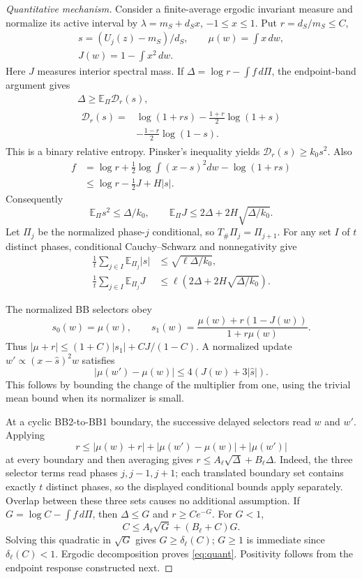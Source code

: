\documentclass[letterpaper,twoside]{article}
\begin{document}
\begin{proof}[Quantitative mechanism]
Consider a finite-average ergodic invariant measure and normalize its active interval by $\lambda=m_S+d_Sx$, $-1\le x\le1$. Put $r=d_S/m_S\le C$,
\[
\begin{gathered}
 s=(U_j(z)-m_S)/d_S,\qquad\mu(w)=\int x\,dw,\\
 J(w)=1-\int x^2\,dw.
\end{gathered}
\]
Here $J$ measures interior spectral mass. If $\Delta=\log r-\int f\,d\Pi$, the endpoint-band argument gives
\[
\begin{gathered}
 \Delta\ge\mathbb E_\Pi\mathcal D_r(s),\\
 \begin{aligned}
 \mathcal D_r(s)={}&\log(1+rs)-\tfrac{1+r}{2}\log(1+s)\\
 &-\tfrac{1-r}{2}\log(1-s).
 \end{aligned}
\end{gathered}
\]
This is a binary relative entropy. Pinsker's inequality yields $\mathcal D_r(s)\ge k_0s^2$. Also
\[
\begin{aligned}
 f&=\log r+\tfrac12\log\!\int(x-s)^2dw-\log(1+rs)\\
 &\le\log r-\tfrac12J+H|s|.
\end{aligned}
\]
Consequently
\begin{equation}\label{eq:defects}
 \mathbb E_\Pi s^2\le\Delta/k_0,\qquad
 \mathbb E_\Pi J\le 2\Delta+2H\sqrt{\Delta/k_0}.
\end{equation}
Let $\Pi_j$ be the normalized phase-$j$ conditional, so $T_\#\Pi_j=\Pi_{j+1}$. For any set $I$ of $t$ distinct phases, conditional Cauchy--Schwarz and nonnegativity give
\[
\begin{aligned}
 \frac1t\sum_{j\in I}\mathbb E_{\Pi_j}|s|&\le\sqrt{\ell\Delta/k_0},\\
 \frac1t\sum_{j\in I}\mathbb E_{\Pi_j}J
 &\le\ell(2\Delta+2H\sqrt{\Delta/k_0}).
\end{aligned}
\]

The normalized BB selectors obey
\[
 s_0(w)=\mu(w),\qquad
 s_1(w)=\frac{\mu(w)+r(1-J(w))}{1+r\mu(w)}.
\]
Thus $|\mu+r|\le(1+C)|s_1|+C J/(1-C)$. A normalized update $w'\propto(x-\widehat s)^2w$ satisfies
\[
 |\mu(w')-\mu(w)|\le4(J(w)+3|\widehat s|).
\]
This follows by bounding the change of the multiplier from one, using the trivial mean bound when its normalizer is small.

At a cyclic BB2-to-BB1 boundary, the successive delayed selectors read $w$ and $w'$. Applying
\[
 r\le|\mu(w)+r|+|\mu(w')-\mu(w)|+|\mu(w')|
\]
at every boundary and then averaging gives $r\le A_\ell\sqrt\Delta+B_\ell\Delta$. Indeed, the three selector terms read phases $j,j-1,j+1$; each translated boundary set contains exactly $t$ distinct phases, so the displayed conditional bounds apply separately. Overlap between these three sets causes no additional assumption. If $G=\log C-\int f\,d\Pi$, then $\Delta\le G$ and $r\ge Ce^{-G}$. For $G<1$,
\[
 C\le A_\ell\sqrt G+(B_\ell+C)G.
\]
Solving this quadratic in $\sqrt G$ gives $G\ge\delta_\ell(C)$; $G\ge1$ is immediate since $\delta_\ell(C)<1$. Ergodic decomposition proves \cref{eq:quant}. Positivity follows from the endpoint response constructed next.
\end{proof}
\end{document}
